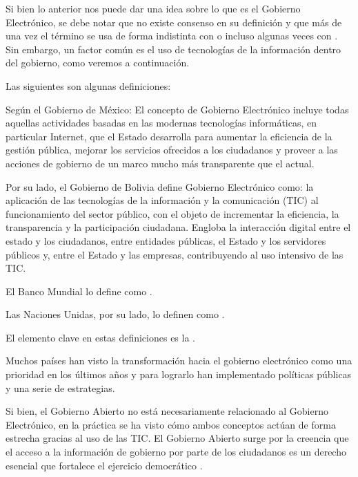 Si bien lo anterior nos puede dar una idea sobre lo que es el Gobierno
Electrónico, se debe notar que no existe consenso en su definición y que más de
una vez el término se usa de forma indistinta con  o
incluso algunas veces con . Sin embargo, un factor
común es el uso de tecnologías de la información dentro del gobierno, como
veremos a continuación.

Las siguientes son algunas definiciones:

Según el Gobierno de México: El concepto de Gobierno Electrónico incluye todas
aquellas actividades basadas en las modernas tecnologías informáticas, en
particular Internet, que el Estado desarrolla para aumentar la eficiencia de la
gestión pública, mejorar los servicios ofrecidos a los ciudadanos y proveer a
las acciones de gobierno de un marco mucho más transparente que el actual.

Por su lado, el Gobierno de Bolivia define Gobierno Electrónico como: la
aplicación de las tecnologías de la información y la comunicación (TIC) al
funcionamiento del sector público, con el objeto de incrementar la eficiencia,
la transparencia y la participación ciudadana.
Engloba la interacción digital
entre el estado y los ciudadanos, entre entidades públicas, el Estado y los
servidores públicos y, entre el Estado y las empresas, contribuyendo al uso
intensivo de las TIC.

El Banco Mundial lo define como .

Las Naciones Unidas, por su lado, lo definen como .

El elemento clave en estas definiciones es la .

Muchos países han visto la transformación hacia el gobierno electrónico como una
prioridad en los últimos años y para lograrlo han implementado políticas
públicas y una serie de estrategias.

Si bien, el Gobierno Abierto no está necesariamente relacionado al Gobierno
Electrónico, en la práctica se ha visto cómo ambos conceptos actúan de forma
estrecha gracias al uso de las TIC. El Gobierno Abierto surge por la creencia
que el acceso a la información de gobierno por parte de los ciudadanos es un
derecho esencial que fortalece el ejercicio democrático
\cite[13]{naserGobiernoElectronicoGestion2011}.

